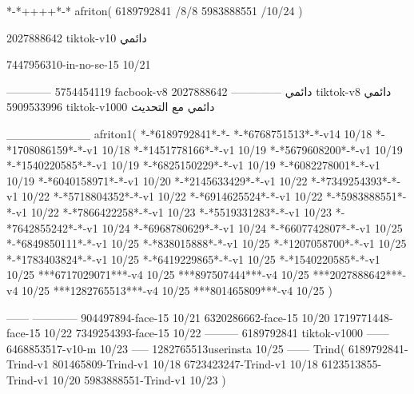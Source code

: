 *-*++++*-*
afriton(
6189792841 /8/8
5983888551 /10/24
)

2027888642 tiktok-v10
دائمي


7447956310-in-no-se-15 10/21

------------
5754454119 facbook-v8
دائمي
--------------
2027888642 tiktok-v8
دائمي
5909533996 tiktok-v1000
دائمي مع التحديث

__________
afriton1(
*-*6189792841*-*-
*-*6768751513*-*-v14 10/18
*-*1708086159*-*-v1 10/18
*-*1451778166*-*-v1 10/19
*-*5679608200*-*-v1 10/19
*-*1540220585*-*-v1 10/19
*-*6825150229*-*-v1 10/19
*-*6082278001*-*-v1 10/19
*-*6040158971*-*-v1 10/20
*-*2145633429*-*-v1 10/22
*-*7349254393*-*-v1 10/22
*-*5718804352*-*-v1 10/22
*-*6914625524*-*-v1 10/22
*-*5983888551*-*-v1 10/22
*-*7866422258*-*-v1 10/23
*-*5519331283*-*-v1 10/23
*-*7642855242*-*-v1 10/24
*-*6968780629*-*-v1 10/24
*-*6607742807*-*-v1 10/25
*-*6849850111*-*-v1 10/25
*-*838015888*-*-v1 10/25
*-*1207058700*-*-v1 10/25
*-*1783403824*-*-v1 10/25
*-*6419229865*-*-v1 10/25
*-*1540220585*-*-v1 10/25
***6717029071***-v4 10/25
***897507444***-v4 10/25
***2027888642***-v4 10/25
***1282765513***-v4 10/25
***801465809***-v4 10/25
)

------
------------
904497894-face-15 10/21
6320286662-face-15 10/20
1719771448-face-15 10/22
7349254393-face-15 10/22
---------
6189792841 tiktok-v1000
------
6468853517-v10-m 10/23
-----
1282765513userinsta 10/25
------
Trind(
6189792841-Trind-v1 
801465809-Trind-v1 10/18
6723423247-Trind-v1 10/18
6123513855-Trind-v1 10/20
5983888551-Trind-v1 10/23
)
